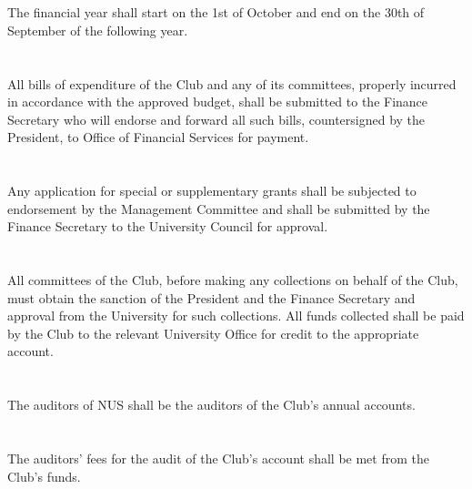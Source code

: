 
\section{}
The financial year shall start on the 1st of October and end on the 30th of September of the following year.

\section{}
All bills of expenditure of the Club and any of its committees, properly incurred in accordance with the approved budget, shall be submitted to the Finance Secretary who will endorse and forward all such bills, countersigned by the President, to Office of Financial Services for payment.

\section{}
Any application for special or supplementary grants shall be subjected to endorsement by the Management Committee and shall be submitted by the Finance Secretary to the University Council for approval.

\section{}
All committees of the Club, before making any collections on behalf of the Club, must obtain the sanction of the President and the Finance Secretary and approval from the University for such collections. All funds collected shall be paid by the Club to the relevant University Office for credit to the appropriate account.

\section{}
The auditors of NUS shall be the auditors of the Club's annual accounts.

\section{}
The auditors’ fees for the audit of the Club's account shall be met from the Club's funds.